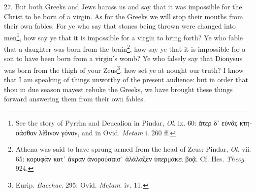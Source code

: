 27. But both Greeks and Jews harass us and say that it was impossible for the Christ to be born of a virgin. As for the Greeks we will stop their mouths from their own fables. For ye who say that stones being thrown were changed into men\footnote{See the story of Pyrrha and Deucalion in Pindar, \emph{Ol}. ix. 60: \textgreek{ἄτερ δ᾽ εὐνᾶς κτησάσθαν λίθινον γόνον}, and in Ovid. \emph{Metam} i. 260 ff.}, how say ye that it is impossible for a virgin to bring forth? Ye who fable that a daughter was born from the brain\footnote{Athena was said to have sprung armed from the head of Zeus: Pindar, \emph{Ol}. vii. 65: \textgreek{κορυφὰν κατ᾽ ἄκραν ἀνορούσαισ᾽ ἀλάλαξεν ὑπερμάκει βοᾷ}. Cf. Hes. \emph{Theog}. 924.}, how say ye that it is impossible for a son to have been born from a virgin’s womb? Ye who falsely say that Dionysus was born from the thigh of your Zeus\footnote{Eurip. \emph{Bacchae}. 295; Ovid. \emph{Metam}. iv. 11.}, how set ye at nought our truth? I know that I am speaking of things unworthy of the present audience: but in order that thou in due season mayest rebuke the Greeks, we have brought these things forward answering them from their own fables.

